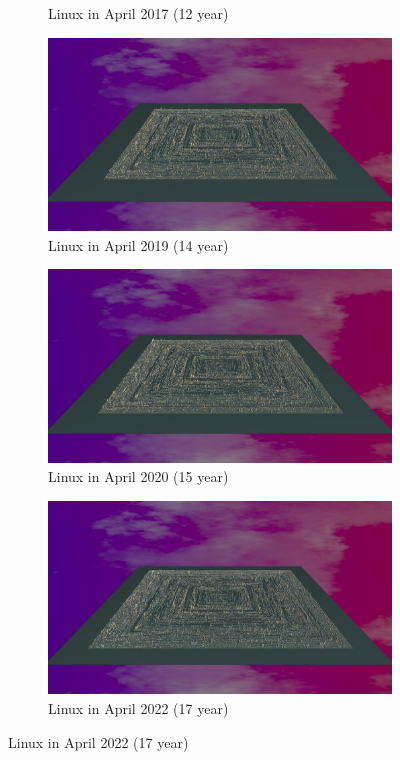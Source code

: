\begin{figure}[ht]
\begin{subfigure}{0.48\textwidth}
        \caption{Linux in April 2017 (12 year)} 
        \label{fig:Linux_V7_S3}
    \end{subfigure}\hspace*{\fill}
    \begin{subfigure}{0.48\textwidth}
        \includegraphics[width=\linewidth]{Linux/Animation014.png}
        \caption{Linux in April 2019  (14 year)} 
        \label{fig:Linux_V7_S4}
    \end{subfigure}
    \medskip
    \begin{subfigure}{0.48\textwidth}
        \includegraphics[width=\linewidth]{Linux/Animation015.png}
        \caption{Linux in April 2020 (15 year)} 
        \label{fig:Linux_V7_S5}
    \end{subfigure}\hspace*{\fill}
    \begin{subfigure}{0.48\textwidth}
        \includegraphics[width=\linewidth]{Linux/Animation017.png}
        \caption{Linux in April 2022 (17 year)} 
        \label{fig:Linux_V7_S6}
    \end{subfigure}
    

\end{figure}
